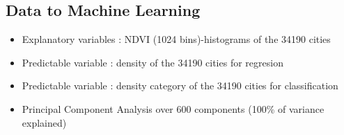 \documentclass[c]{beamer}
\begin{document}
\subsection{Data to Machine Learning}
\begin{frame}
\tableofcontents[currentsubsection]
\end{frame}

\begin{frame}
 \begin{itemize}
  \item Explanatory variables : NDVI (1024 bins)-histograms of the 34190 cities
  \item Predictable variable : density of the 34190 cities for regresion
  \item Predictable variable : density category of the 34190 cities for classification
  \item Principal Component Analysis over 600 components (100\% of variance explained)
 \end{itemize}
 
\begin{columns}
\begin{column}{0.8\textwidth}
\begin{table}
\begin{center}
\begin{adjustbox}{max width=0.9\textwidth}
\begin{tabular}{|c|c|c|c|c|c|c|c|c|c|c|}


\end{tabular}
\end{adjustbox}
\end{center}
\end{table}
\end{column}
\end{columns}
\end{frame}
\end{document}
